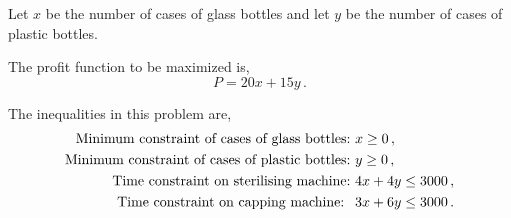 %
%

\usetikzlibrary{patterns}

\begin{subquestions}


\subquestion

Let $x$ be the number of cases of glass bottles and let $y$ be the number of cases of plastic bottles.

\begin{subsubquestions}

\subsubquestion

\begin{subsubsubquestions}


\subsubsubquestion

The profit function to be maximized is,
\begin{equation}
	P = 20x + 15y \,.
\end{equation}


\subsubsubquestion

The inequalities in this problem are,
\begin{align}
	\text{Minimum constraint of cases of glass bottles:} & \ x \geq 0 \,, \nonumber \\
	\text{Minimum constraint of cases of plastic bottles:} & \ y \geq 0 \,, \nonumber \\
	\text{Time constraint on sterilising machine:} & \ 4x + 4y \leq 3000 \,, \nonumber \\
	\text{Time constraint on capping machine: } & \ 3x + 6y \leq 3000 \,.
\end{align}


\end{subsubsubquestions}
\end{subsubquestions}
\end{subquestions}

